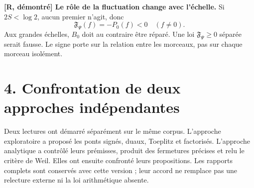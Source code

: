\documentclass[
  10pt,
  a4paper,
]{article}
\begin{document}
\textbf{{[}R, démontré{]} Le rôle de la fluctuation change avec
l'échelle.} Si \(2S<\log2\), aucun premier n'agit, donc \[
\mathfrak F_\Psi(f)=-P_0(f)<0\quad(f\ne0).
\] Aux grandes échelles, \(B_0\) doit au contraire être réparé. Une loi
\(\mathfrak F_\Psi\ge0\) séparée serait fausse. Le signe porte sur la
relation entre les morceaux, pas sur chaque morceau isolément.

\hypertarget{confrontation-de-deux-approches-induxe9pendantes}{%
\section{4. Confrontation de deux approches
indépendantes}\label{confrontation-de-deux-approches-induxe9pendantes}}

Deux lectures ont démarré séparément sur le même corpus. L'approche
exploratoire a proposé les ponts signés, duaux, Toeplitz et factorisés.
L'approche analytique a contrôlé leurs prémisses, produit des fermetures
précises et relu le critère de Weil. Elles ont ensuite confronté leurs
propositions. Les rapports complets sont conservés avec cette version ;
leur accord ne remplace pas une relecture externe ni la loi arithmétique
absente.
\end{document}
